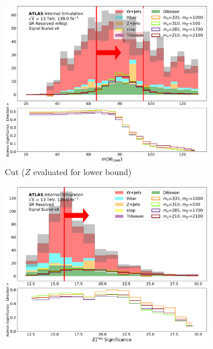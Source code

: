 \begin{figure}[htbp]
\begin{subfigure}[t]{0.48\textwidth}
    \centering
     \includegraphics[width = 0.99\textwidth]{Figures/5/SR1L_Resolved_mWgt/WCand_m_N_1.pdf}
     \caption{\Wcandm Cut (\(Z\) evaluated for lower bound)}
    \end{subfigure}
    \begin{subfigure}[t]{0.48\textwidth}
    \centering
     \includegraphics[width = 0.99\textwidth]{Figures/5/SR1L_Resolved/MetTST_Significance_N_1.pdf}
    \caption{\metsig}
    \end{subfigure}
    \begin{subfigure}[t]{0.48\textwidth}
    \centering

\end{subfigure}
\end{figure}
